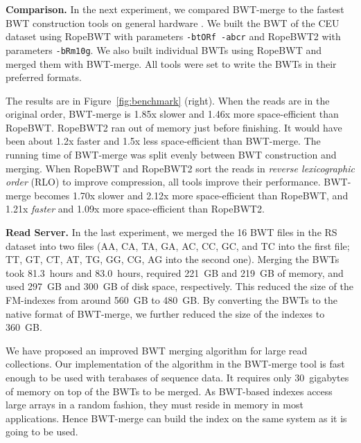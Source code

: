 \documentclass[smallabstract,smallcaptions]{dccpaper}
\newcommand{\BWT}{\textsf{BWT}}
\newcommand{\BWTmerge}{\textsf{BWT\nobreakdash-merge}}
\newcommand{\ropebwt}{\textsf{RopeBWT}}
\newcommand{\ropebwtii}{\textsf{RopeBWT2}}
\newcommand{\CEU}{\textsf{CEU}}
\newcommand{\RS}{\textsf{RS}}
\begin{document}
\smallbreak\noindent\textbf{Comparison.} In the next experiment, we compared \BWTmerge{} to the fastest \BWT{} construction tools on general hardware \cite{Li2014a}. We built the \BWT{} of the \CEU{} dataset using \ropebwt{} \cite{Li2011-2013} with parameters \texttt{-btORf -abcr} and \ropebwtii{} \cite{Li2014a} with parameters \texttt{-bRm10g}. We also built individual \BWT{}s using \ropebwt{} and merged them with \BWTmerge. All tools were set to write the \BWT{}s in their preferred formats.

The results are in Figure~\ref{fig:benchmark} (right). When the reads are in the original order, \BWTmerge{} is 1.85x slower and 1.46x more space-efficient than \ropebwt. \ropebwt2{} ran out of memory just before finishing. It would have been about 1.2x faster and 1.5x less space-efficient than \BWTmerge. The running time of \BWTmerge{} was split evenly between \BWT{} construction and merging.
%
When \ropebwt{} and \ropebwt2{} sort the reads in \emph{reverse lexicographic order} (RLO) to improve compression, all tools improve their performance. \BWTmerge{} becomes 1.70x slower and 2.12x more space-efficient than \ropebwt{}, and 1.21x \emph{faster} and 1.09x more space-efficient than \ropebwt2.

\smallbreak\noindent\textbf{Read Server.} In the last experiment, we merged the 16 \BWT{} files in the \RS{} dataset into two files (AA, CA, TA, GA, AC, CC, GC, and TC into the first file; TT, GT, CT, AT, TG, GG, CG, AG into the second one). Merging the \BWT{}s took 81.3~hours and 83.0~hours, required 221~GB and 219~GB of memory, and used 297~GB and 300~GB of disk space, respectively. This reduced the size of the FM-indexes from around 560~GB to 480~GB. By converting the \BWT{}s to the native format of \BWTmerge{}, we further reduced the size of the indexes to 360~GB.



We have proposed an improved \BWT{} merging algorithm for large read collections. Our implementation of the algorithm in the \BWTmerge{} tool is fast enough to be used with terabases of sequence data. It requires only 30~gigabytes of memory on top of the \BWT{}s to be merged. As \BWT-based indexes access large arrays in a random fashion, they must reside in memory in most applications. Hence \BWTmerge{} can build the index on the same system as it is going to be used.
\end{document}
